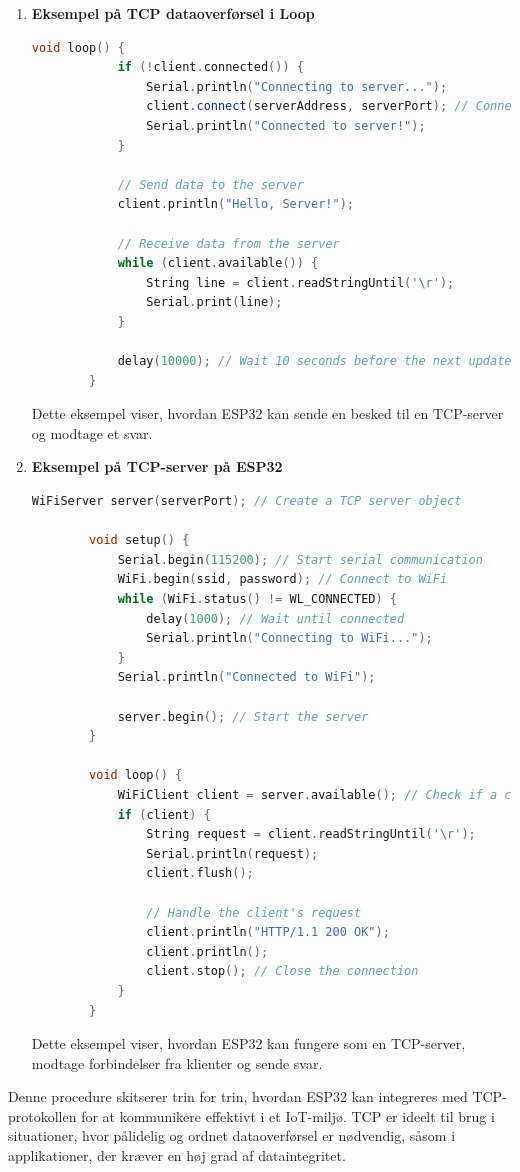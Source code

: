 \begin{enumerate}
	\item \textbf{Eksempel på TCP dataoverførsel i Loop}
	\begin{lstlisting}[language=C++, caption=Syntaks]
		void loop() {
			if (!client.connected()) {
				Serial.println("Connecting to server...");
				client.connect(serverAddress, serverPort); // Connect to TCP server
				Serial.println("Connected to server!");
			}
			
			// Send data to the server
			client.println("Hello, Server!");
			
			// Receive data from the server
			while (client.available()) {
				String line = client.readStringUntil('\r');
				Serial.print(line);
			}
			
			delay(10000); // Wait 10 seconds before the next update
		}
	\end{lstlisting}
	Dette eksempel viser, hvordan ESP32 kan sende en besked til en TCP-server og modtage et svar.
	
	\item \textbf{Eksempel på TCP-server på ESP32}
	\begin{lstlisting}[language=C++, caption=Syntaks]
		WiFiServer server(serverPort); // Create a TCP server object
		
		void setup() {
			Serial.begin(115200); // Start serial communication
			WiFi.begin(ssid, password); // Connect to WiFi
			while (WiFi.status() != WL_CONNECTED) {
				delay(1000); // Wait until connected
				Serial.println("Connecting to WiFi...");
			}
			Serial.println("Connected to WiFi");
			
			server.begin(); // Start the server
		}
		
		void loop() {
			WiFiClient client = server.available(); // Check if a client has connected
			if (client) {
				String request = client.readStringUntil('\r');
				Serial.println(request);
				client.flush();
				
				// Handle the client's request
				client.println("HTTP/1.1 200 OK");
				client.println();
				client.stop(); // Close the connection
			}
		}
	\end{lstlisting}
	Dette eksempel viser, hvordan ESP32 kan fungere som en TCP-server, modtage forbindelser fra klienter og sende svar.
\end{enumerate}
\noindent Denne procedure skitserer trin for trin, hvordan ESP32 kan integreres med TCP-protokollen for at kommunikere effektivt i et IoT-miljø. TCP er ideelt til brug i situationer, hvor pålidelig og ordnet dataoverførsel er nødvendig, såsom i applikationer, der kræver en høj grad af dataintegritet.


